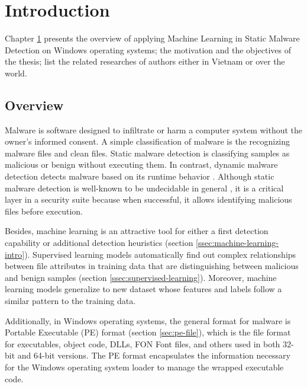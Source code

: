 
\chapter{Introduction}
\label{chap:introduction}
\graphicspath{{Chapter2/Figs/}}

\begin{chapabstract}
Chapter \ref{chap:introduction} presents the overview of applying Machine Learning in Static Malware Detection on Windows operating systems; the motivation and the objectives of the thesis; list the related researches of authors either in Vietnam or over the world.
\end{chapabstract}

\section{Overview}
\label{sec:overview}

Malware is software designed to infiltrate or harm a computer system without the owner's informed consent. 
A simple classification of malware is the recognizing malware files and clean files. 
Static malware detection is classifying samples as malicious or benign without executing them. 
In contrast, dynamic malware detection detects malware based on its runtime behavior \cite{athiwaratkun2017malware, dahl2013large}. 
Although static malware detection is well-known to be undecidable in general \cite{cohen1987computer}, it is a critical layer in a security suite because when successful, it allows identifying malicious files before execution.

Besides, machine learning is an attractive tool for either a first detection capability or additional detection heuristics (section \ref{ssec:machine-learning-intro}).
Supervised learning models automatically find out complex relationships between file attributes in training data that are distinguishing between malicious and benign samples (section \ref{ssec:supervised-learning}).
Moreover, machine learning models generalize to new dataset whose features and labels follow a similar pattern to the training data. 

Additionally, in Windows operating systems, the general format for malware is Portable Executable (PE) format (section \ref{sec:pe-file}), which is the file format for executables, object code, DLLs, FON Font files, and others used in both 32-bit and 64-bit versions. The PE format encapsulates the information necessary for the Windows operating system loader to manage the wrapped executable code.

